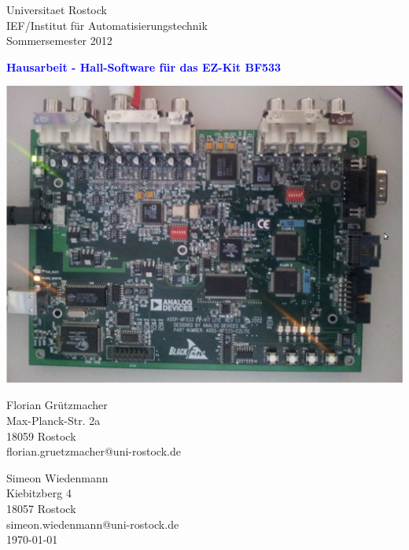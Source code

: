 \documentclass[a4paper,12pt,fontsize=12,DIV=12]{scrartcl}
\begin{document}
\begin{titlepage}
\begin{small}
\vfill {Universitaet Rostock\\ 
IEF/Institut für Automatisierungstechnik\\ 
Sommersemester 2012}
\end{small}


\begin{center}
\begin{Large}
\vfill {\textsf{\textbf{
	\textcolor{blue}{Hausarbeit - Hall-Software für das EZ-Kit BF533}
}}}
\end{Large}
\end{center}

\begin{center}
\vspace{2.0cm}
\includegraphics[scale=0.4]{Bilder/Signalprozessor.jpg}
\end{center}

\begin{small}
\vfill Florian Grützmacher \\ Max-Planck-Str. 2a \\  18059 Rostock \\  florian.gruetzmacher@uni-rostock.de\\ 
\end{small}

\vspace{-1.0cm}

\begin{small}
\vfill Simeon Wiedenmann \\ Kiebitzberg 4 \\  18057 Rostock \\  simeon.wiedenmann@uni-rostock.de\\ 
\newline
\today
\end{small}

\end{titlepage}
\end{document}
